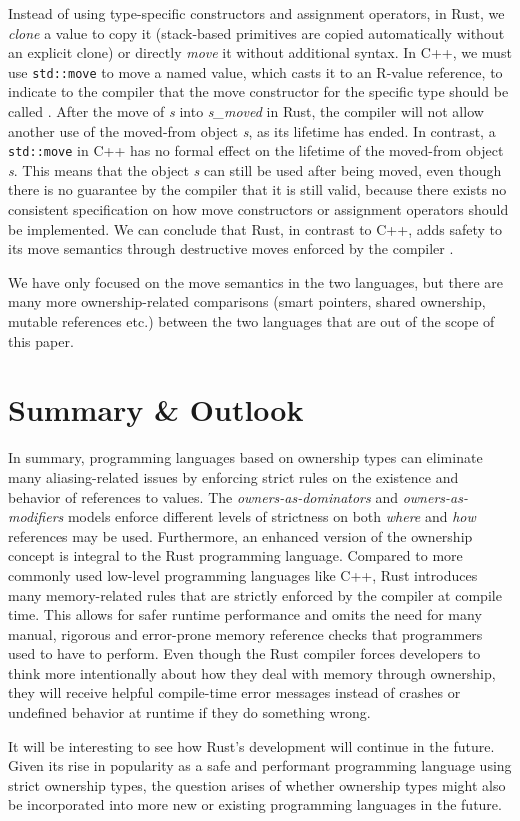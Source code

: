\documentclass[sigplan,11pt,nonacm]{acmart}
\begin{document}
Instead of using type-specific constructors and assignment operators, in Rust, we \emph{clone} a value to copy it (stack-based primitives are copied automatically without an explicit clone) or directly \emph{move} it without additional syntax.
In C++, we must use \verb|std::move| to move a named value, which casts it to an R-value reference, to indicate to the compiler that the move constructor for the specific type should be called \cite{cpp-rust-ownership}.
After the move of \emph{s} into \emph{s\_moved} in Rust, the compiler will not allow another use of the moved-from object \emph{s}, as its lifetime has ended.
In contrast, a \verb|std::move| in C++ has no formal effect on the lifetime of the moved-from object \emph{s}.
This means that the object \emph{s} can still be used after being moved, even though there is no guarantee by the compiler that it is still valid, because there exists no consistent specification on how move constructors or assignment operators should be implemented.
We can conclude that Rust, in contrast to C++, adds safety to its move semantics through destructive moves enforced by the compiler \cite{cpp-rust-ownership}.

We have only focused on the move semantics in the two languages, but there are many more ownership-related comparisons (smart pointers, shared ownership, mutable references etc.) between the two languages that are out of the scope of this paper.


\section{Summary \& Outlook}
\label{sec:summary}

In summary, programming languages based on ownership types can eliminate many aliasing-related issues by enforcing strict rules on the existence and behavior of references to values.
The \emph{owners-as-dominators} and \emph{owners-as-modifiers} models enforce different levels of strictness on both \emph{where} and \emph{how} references may be used.
Furthermore, an enhanced version of the ownership concept is integral to the Rust programming language.
Compared to more commonly used low-level programming languages like C++, Rust introduces many memory-related rules that are strictly enforced by the compiler at compile time.
This allows for safer runtime performance and omits the need for many manual, rigorous and error-prone memory reference checks that programmers used to have to perform.
Even though the Rust compiler forces developers to think more intentionally about how they deal with memory through ownership, they will receive helpful compile-time error messages instead of crashes or undefined behavior at runtime if they do something wrong.

It will be interesting to see how Rust's development will continue in the future.
Given its rise in popularity as a safe and performant programming language using strict ownership types, the question arises of whether ownership types might also be incorporated into more new or existing programming languages in the future.



\end{document}
